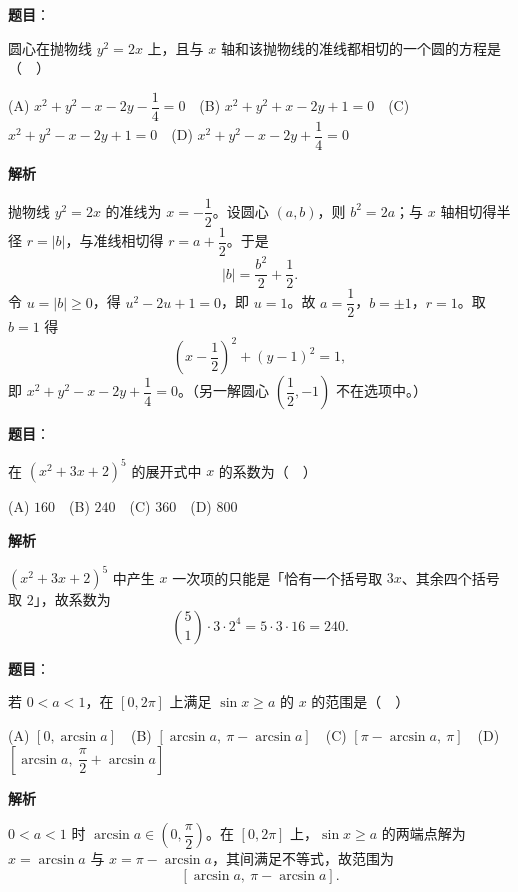 \begin{answer}

\textbf{题目}：

圆心在抛物线 \(y^{2}=2x\) 上，且与 \(x\) 轴和该抛物线的准线都相切的一个圆的方程是（　）

(A) \(x^{2}+y^{2}-x-2y-\dfrac{1}{4}=0\)　(B) \(x^{2}+y^{2}+x-2y+1=0\)　(C) \(x^{2}+y^{2}-x-2y+1=0\)　(D) \(x^{2}+y^{2}-x-2y+\dfrac{1}{4}=0\)

\textbf{解析}

抛物线 \(y^2=2x\) 的准线为 \(x=-\dfrac12\)。设圆心 \((a,b)\)，则 \(b^2=2a\)；与 \(x\) 轴相切得半径 \(r=|b|\)，与准线相切得 \(r=a+\dfrac12\)。于是
\nopagebreak[4]
\[
|b|=\frac{b^2}{2}+\frac12.
\]
令 \(u=|b|\ge0\)，得 \(u^2-2u+1=0\)，即 \(u=1\)。故 \(a=\dfrac12\)，\(b=\pm1\)，\(r=1\)。取 \(b=1\) 得
\nopagebreak[4]
\[
\left(x-\frac12\right)^2+(y-1)^2=1,
\]
即 \(x^2+y^2-x-2y+\dfrac14=0\)。（另一解圆心 \(\left(\dfrac12,-1\right)\) 不在选项中。）


\end{answer}
\begin{answer}

\textbf{题目}：

在 \((x^{2}+3x+2)^{5}\) 的展开式中 \(x\) 的系数为（　）

(A) \(160\)　(B) \(240\)　(C) \(360\)　(D) \(800\)

\textbf{解析}

\((x^2+3x+2)^5\) 中产生 \(x\) 一次项的只能是「恰有一个括号取 \(3x\)、其余四个括号取 \(2\)」，故系数为
\nopagebreak[4]
\[
\binom51\cdot3\cdot2^4=5\cdot3\cdot16=240.
\]


\end{answer}
\begin{answer}

\textbf{题目}：

若 \(0<a<1\)，在 \([0,2\pi]\) 上满足 \(\sin x\geqslant a\) 的 \(x\) 的范围是（　）

(A) \([0,\arcsin a]\)　(B) \([\arcsin a,\ \pi-\arcsin a]\)　(C) \([\pi-\arcsin a,\ \pi]\)　(D) \(\left[\arcsin a,\ \dfrac{\pi}{2}+\arcsin a\right]\)

\textbf{解析}

\(0<a<1\) 时 \(\arcsin a\in\left(0,\dfrac{\pi}{2}\right)\)。在 \([0,2\pi]\) 上，\(\sin x\geqslant a\) 的两端点解为 \(x=\arcsin a\) 与 \(x=\pi-\arcsin a\)，其间满足不等式，故范围为
\nopagebreak[4]
\[
[\arcsin a,\ \pi-\arcsin a].
\]


\end{answer}
